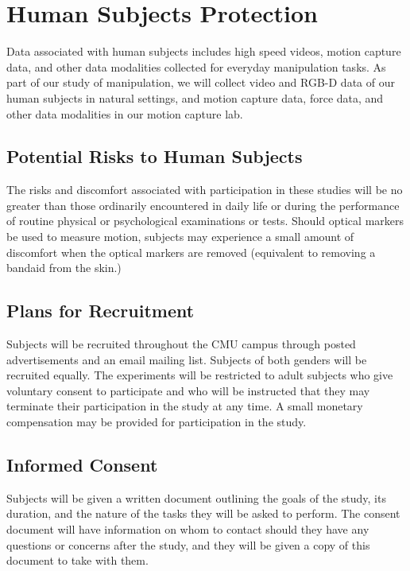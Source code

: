 
\section*{Human Subjects Protection}

Data associated with human subjects includes high speed videos, motion capture data, and other data
    modalities collected for everyday manipulation tasks.  As part of
  our study of manipulation, we will collect video and RGB-D data of
  our human subjects in natural settings, and motion capture data,
  force data, and other data modalities in our motion capture lab.




\subsection*{Potential Risks to Human Subjects}

The risks and discomfort associated with participation in these
studies will be no greater than those ordinarily encountered in daily
life or during the performance of routine physical or psychological
examinations or tests.  Should optical markers be used to measure
motion, subjects may experience a small amount of discomfort when the
optical markers are removed (equivalent to removing a bandaid from the
skin.)

\subsection*{Plans for Recruitment}


Subjects will be recruited throughout the CMU campus through posted
advertisements and an email mailing list.   Subjects of both genders
will be recruited equally.  The experiments will be restricted to
adult subjects who give voluntary consent to participate and who will
be instructed that they may terminate their participation in the study
at any time.   A small monetary compensation may be
provided for participation in the study.


\subsection*{Informed Consent}

Subjects will be given a written document outlining the goals of the
study, its duration, and the nature of the tasks they will be asked to
perform.  The consent document will have information on whom to
contact should they have any questions or concerns after the study,
and they will be given a copy of this document to take with them.

